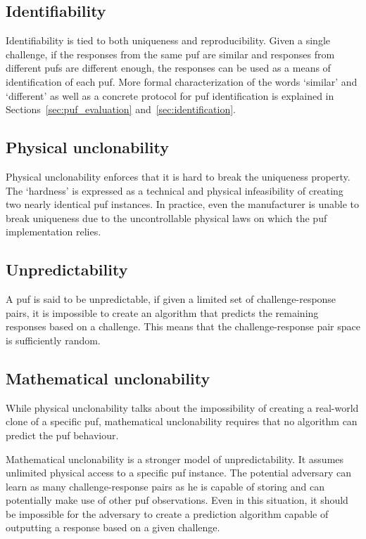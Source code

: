 \subsection*{Identifiability}\label{sec:identifiability}

Identifiability is tied to both uniqueness and reproducibility. Given a single challenge, if the responses from the same \gls{puf} are similar and responses from different \glspl{puf} are different enough, the responses can be used as a means of identification of each \gls{puf}. More formal characterization of the words `similar' and `different' as well as a concrete protocol for \gls{puf} identification is explained in Sections~\ref{sec:puf_evaluation} and~\ref{sec:identification}.

\subsection*{Physical unclonability}
 
Physical unclonability enforces that it is hard to break the uniqueness property. The `hardness' is expressed as a technical and physical infeasibility of creating two nearly identical \gls{puf} instances. In practice, even the manufacturer is unable to break uniqueness due to the uncontrollable physical laws on which the \gls{puf} implementation relies.

\subsection*{Unpredictability}

A \gls{puf} is said to be unpredictable, if given a limited set of challenge-response pairs, it is impossible to create an algorithm that predicts the remaining responses based on a challenge. This means that the challenge-response pair space is sufficiently random.

\subsection*{Mathematical unclonability}

While physical unclonability talks about the impossibility of creating a real-world clone of a specific \gls{puf}, mathematical unclonability requires that no algorithm can predict the \gls{puf} behaviour.

Mathematical unclonability is a stronger model of unpredictability. It assumes unlimited physical access to a specific \gls{puf} instance. The potential adversary can learn as many challenge-response pairs as he is capable of storing and can potentially make use of other \gls{puf} observations. Even in this situation, it should be impossible for the adversary to create a prediction algorithm capable of outputting a response based on a given challenge. 

